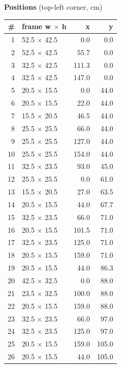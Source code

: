 \documentclass[a4paper,landscape,10pt]{article}
\begin{document}
\begin{minipage}[t]{0.25\textwidth}
\vspace{8pt}
{\bfseries Positions} (top-left corner, cm)\\[2pt]
\tiny
\begin{tabular}{@{}r l r r@{}}
\toprule
\# & frame w $\times$ h & x & y \\
\midrule
1 & 52.5 $\times$ 42.5 & 0.0 & 0.0 \\
2 & 52.5 $\times$ 42.5 & 55.7 & 0.0 \\
3 & 32.5 $\times$ 42.5 & 111.3 & 0.0 \\
4 & 32.5 $\times$ 42.5 & 147.0 & 0.0 \\
5 & 20.5 $\times$ 15.5 & 0.0 & 44.0 \\
6 & 20.5 $\times$ 15.5 & 22.0 & 44.0 \\
7 & 15.5 $\times$ 20.5 & 46.5 & 44.0 \\
8 & 25.5 $\times$ 25.5 & 66.0 & 44.0 \\
9 & 25.5 $\times$ 25.5 & 127.0 & 44.0 \\
10 & 25.5 $\times$ 25.5 & 154.0 & 44.0 \\
11 & 32.5 $\times$ 23.5 & 93.0 & 45.0 \\
12 & 25.5 $\times$ 25.5 & 0.0 & 61.0 \\
13 & 15.5 $\times$ 20.5 & 27.0 & 63.5 \\
14 & 20.5 $\times$ 15.5 & 44.0 & 67.7 \\
15 & 32.5 $\times$ 23.5 & 66.0 & 71.0 \\
16 & 20.5 $\times$ 15.5 & 101.5 & 71.0 \\
17 & 32.5 $\times$ 23.5 & 125.0 & 71.0 \\
18 & 20.5 $\times$ 15.5 & 159.0 & 71.0 \\
19 & 20.5 $\times$ 15.5 & 44.0 & 86.3 \\
20 & 42.5 $\times$ 32.5 & 0.0 & 88.0 \\
21 & 23.5 $\times$ 32.5 & 100.0 & 88.0 \\
22 & 20.5 $\times$ 15.5 & 159.0 & 88.0 \\
23 & 32.5 $\times$ 23.5 & 66.0 & 97.0 \\
24 & 32.5 $\times$ 23.5 & 125.0 & 97.0 \\
25 & 20.5 $\times$ 15.5 & 159.0 & 105.0 \\
26 & 20.5 $\times$ 15.5 & 44.0 & 105.0 \\
\bottomrule
\end{tabular}
\end{minipage}
\clearpage
\end{document}
